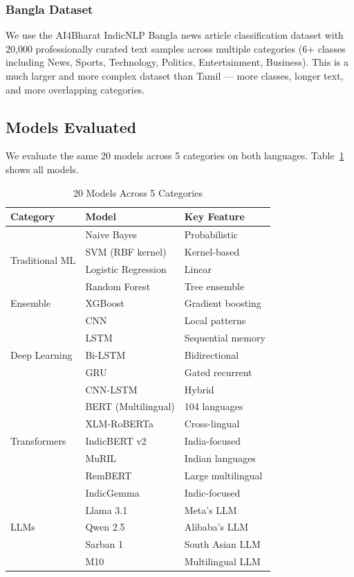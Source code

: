 \documentclass[conference]{IEEEtran}
\begin{document}
\subsubsection{Bangla Dataset}
We use the AI4Bharat IndicNLP Bangla news article classification dataset with 20,000 professionally curated text samples across multiple categories (6+ classes including News, Sports, Technology, Politics, Entertainment, Business). This is a much larger and more complex dataset than Tamil --- more classes, longer text, and more overlapping categories.

\subsection{Models Evaluated}

We evaluate the same 20 models across 5 categories on both languages. Table~\ref{tab:models} shows all models.

\begin{table}[h]
\centering
\caption{20 Models Across 5 Categories}
\label{tab:models}
\begin{tabular}{lll}
\toprule
\textbf{Category} & \textbf{Model} & \textbf{Key Feature} \\
\midrule
\multirow{4}{*}{Traditional ML} & Naive Bayes & Probabilistic \\
& SVM (RBF kernel) & Kernel-based \\
& Logistic Regression & Linear \\
& Random Forest & Tree ensemble \\
\midrule
Ensemble & XGBoost & Gradient boosting \\
\midrule
\multirow{5}{*}{Deep Learning} & CNN & Local patterns \\
& LSTM & Sequential memory \\
& Bi-LSTM & Bidirectional \\
& GRU & Gated recurrent \\
& CNN-LSTM & Hybrid \\
\midrule
\multirow{5}{*}{Transformers} & BERT (Multilingual) & 104 languages \\
& XLM-RoBERTa & Cross-lingual \\
& IndicBERT v2 & India-focused \\
& MuRIL & Indian languages \\
& RemBERT & Large multilingual \\
\midrule
\multirow{5}{*}{LLMs} & IndicGemma & Indic-focused \\
& Llama 3.1 & Meta's LLM \\
& Qwen 2.5 & Alibaba's LLM \\
& Sarban 1 & South Asian LLM \\
& M10 & Multilingual LLM \\
\bottomrule
\end{tabular}
\end{table}
\end{document}
